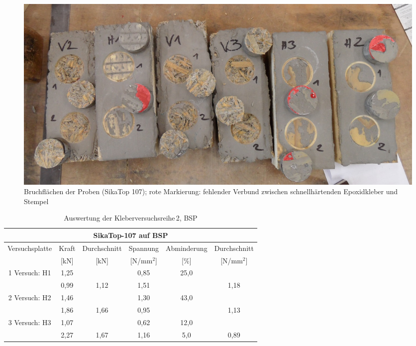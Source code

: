 \begin{figure}
\begin{center}
\includegraphics[scale =0.8]{Verbindungsmittel/kleber/Probenbild.jpg}
\caption{Bruchflächen der Proben (SikaTop 107); rote Markierung: fehlender Verbund zwischen schnellhärtenden Epoxidkleber und Stempel}
\label{probenbild}
\end{center}
\end{figure}





\begin{table}
\caption{Auswertung der Kleberversuchsreihe\,2, BSP}
\begin{tabular}{|c|c|c|c|c|c|} \hline
\multicolumn{6}{|c|}{SikaTop-107 auf BSP} \\\hline
Versuchsplatte & Kraft & Durchschnitt & Spannung & Abminderung & Durchschnitt \\
	& [kN] & [kN] & [N/mm$^{2}$] & [\%] & [N/mm$^{2}$] \\
	\hline\hline
\cline{2-2} 1 Versuch: H1  & 1,25 & & 0,85& 25,0& \\\cline{2-2}&0,99 & 1,12 &1,51 & & 1,18
\\\hline\hline

\cline{2-2} 2 Versuch: H2  & 1,46 & & 1,30& 43,0& \\\cline{2-2}&1,86 & 1,66 &0,95 & & 1,13
\\\hline\hline

\cline{2-2} 3 Versuch: H3 & 1,07 & & 0,62&12,0 & \\\cline{2-2}&2,27 &1,67 &1,16 & 5,0 & 0,89 
\\\hline

\end{tabular}
 \label{tab:2.1 kleberversuche}
 \end{table}

